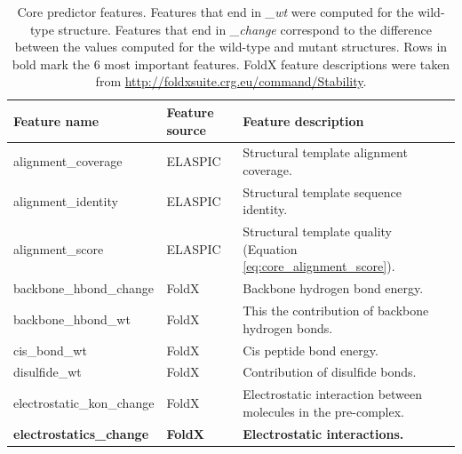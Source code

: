 \clearpage

\begin{table}[tb]
	\centering
	\caption[Features selected for the core predictor.]{
		Core predictor features.
		Features that end in \textit{\_wt} were computed for the wild-type structure.
		Features that end in \textit{\_change} correspond to the difference between the values computed for the wild-type and mutant structures.
		Rows in bold mark the 6 most important features.
		FoldX feature descriptions were taken from \url{http://foldxsuite.crg.eu/command/Stability}.
	}
	\label{tab:core_features}
	\begin{tabular}{ l | l | p{7cm} }
		\toprule
		Feature name                              & Feature source   & Feature description                                                                                 \\
		\midrule
		alignment\_coverage                       & ELASPIC          & Structural template alignment coverage.                                                             \\
		alignment\_identity                       & ELASPIC          & Structural template sequence identity.                                                              \\
		alignment\_score                          & ELASPIC          & Structural template quality (Equation \ref{eq:core_alignment_score}).                               \\
		backbone\_hbond\_change                   & FoldX            & Backbone hydrogen bond energy.                                                                      \\
		backbone\_hbond\_wt                       & FoldX            & This the contribution of backbone hydrogen bonds.                                                   \\
		cis\_bond\_wt                             & FoldX            & Cis peptide bond energy.                                                                            \\
		disulfide\_wt                             & FoldX            & Contribution of disulfide bonds.                                                                    \\
		electrostatic\_kon\_change                & FoldX            & Electrostatic interaction between molecules in the pre-complex.                                     \\
		\textbf{electrostatics\_change}           & \textbf{FoldX}   & \textbf{Electrostatic interactions.}                                                                \\

\end{tabular}
\end{table}
